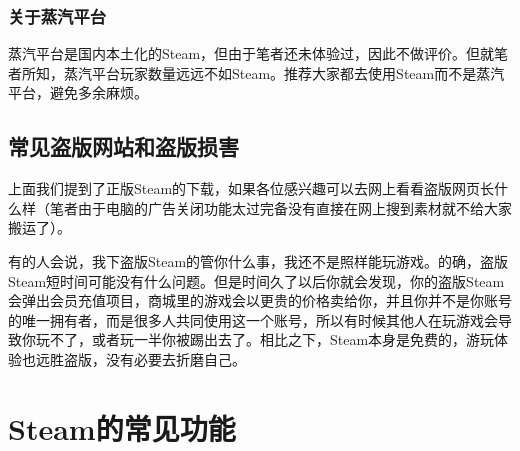 \documentclass{article}
\begin{document}
    \subsubsection{关于蒸汽平台}
    蒸汽平台是国内本土化的Steam，但由于笔者还未体验过，因此不做评价。但就笔者所知，蒸汽平台玩家数量远远不如Steam。推荐大家都去使用Steam而不是蒸汽平台，避免多余麻烦。
    
    \subsection{常见盗版网站和盗版损害}
    上面我们提到了正版Steam的下载，如果各位感兴趣可以去网上看看盗版网页长什么样（笔者由于电脑的广告关闭功能太过完备没有直接在网上搜到素材就不给大家搬运了）。
    
    有的人会说，我下盗版Steam的管你什么事，我还不是照样能玩游戏。的确，盗版Steam短时间可能没有什么问题。但是时间久了以后你就会发现，你的盗版Steam会弹出会员充值项目，商城里的游戏会以更贵的价格卖给你，并且你并不是你账号的唯一拥有者，而是很多人共同使用这一个账号，所以有时候其他人在玩游戏会导致你玩不了，或者玩一半你被踢出去了。相比之下，Steam本身是免费的，游玩体验也远胜盗版，没有必要去折磨自己。

\section{Steam的常见功能}
\end{document}
